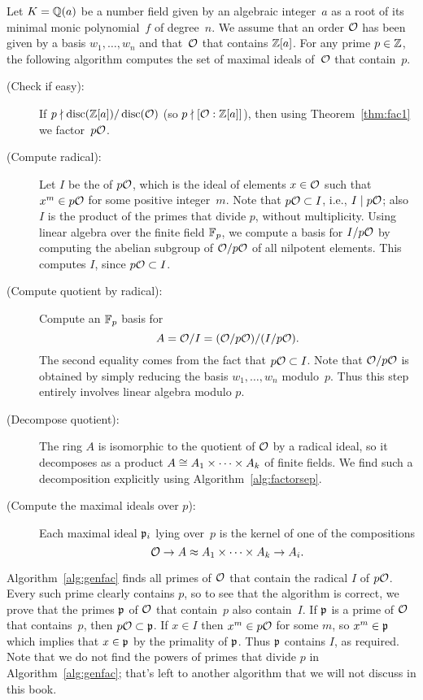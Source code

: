 \begin{algorithm}\label{alg:genfac}
	Let $K=\mathbb{Q}(a)$ be a number field given by an algebraic integer~$a$
	as a root of its minimal monic polynomial~$f$ of degree~$n$.
	We assume that an order $\mathcal{O}$ has been given by a basis $w_1,\ldots,w_n$
	and that~$\mathcal{O}$ that contains $\mathbb{Z}[a]$.
	For any prime $p\in\mathbb{Z}$, the following algorithm computes the set of
	maximal ideals of~$\mathcal{O}$ that contain~$p$.
	\begin{description}
		\item[\normalfont (Check if easy):] If $p\nmid \operatorname{disc}(\mathbb{Z}[a]) / \operatorname{disc}(\mathcal{O})$ (so
		$p\nmid [\mathcal{O}:\mathbb{Z}[a]]$), then using Theorem~\ref{thm:fac1} we
		factor~$p\mathcal{O}$.

		\item[\normalfont (Compute radical):]
		Let $I$ be the  of $p\mathcal{O}$, which is the ideal of
		elements $x\in\mathcal{O}$ such that $x^m\in p\mathcal{O}$
		for some positive integer~$m$.  Note that $p\mathcal{O} \subset I$, i.e.,
		$I\mid p\mathcal{O}$; also~$I$ is the product
		of the primes that divide $p$, without multiplicity.
		Using linear algebra over the finite field
		$\mathbb{F}_p$, we compute a basis for $I/p\mathcal{O}$ by computing
		the abelian subgroup of $\mathcal{O}/p\mathcal{O}$ of all nilpotent
		elements.  This computes $I$, since $p\mathcal{O}\subset I$.

		\item[\normalfont (Compute quotient by radical):]
		Compute an $\mathbb{F}_p$ basis for
		$$
			A = \mathcal{O}/I = (\mathcal{O}/p\mathcal{O})/(I/p\mathcal{O}).
		$$
		The second equality comes from the fact that $p\mathcal{O}\subset I$.
		Note that $\mathcal{O}/p\mathcal{O}$
		is obtained by simply reducing the basis $w_1,\ldots, w_n$ modulo~$p$.
		Thus this step entirely involves linear algebra modulo $p$.

		\item[\normalfont (Decompose quotient):] The ring $A$ is isomorphic to
		the quotient of $\mathcal{O}$ by a radical ideal,
		so it decomposes as a product
		$A \cong A_1 \times \cdots \times A_k$ of finite fields.
		We find such a decomposition explicitly using Algorithm~\ref{alg:factorsep}.

		\item[\normalfont (Compute the maximal ideals over $p$):] Each maximal ideal
		$\mathfrak{p}_i$ lying over~$p$ is the kernel of one of the compositions
		$$
			\mathcal{O} \to A \approx A_1 \times \cdots \times A_k \to A_i.
		$$
	\end{description}
\end{algorithm}
Algorithm~\ref{alg:genfac} finds all primes of $\mathcal{O}$ that contain the radical $I$ of
$p\mathcal{O}$.  Every such prime clearly contains $p$, so to see that the
algorithm is correct, we prove that the primes $\mathfrak{p}$ of $\mathcal{O}$ that
contain~$p$ also contain~$I$.  If $\mathfrak{p}$ is a prime of $\mathcal{O}$ that
contains~$p$, then $p\mathcal{O} \subset \mathfrak{p}$.  If $x\in I$ then $x^m\in p\mathcal{O}$
for some $m$, so $x^m\in \mathfrak{p}$ which implies that $x\in \mathfrak{p}$ by the primality
of $\mathfrak{p}$.  Thus $\mathfrak{p}$ contains $I$, as required.  Note that we do not find the powers of
primes that divide $p$ in Algorithm~\ref{alg:genfac}; that's left to another
algorithm that we will not discuss in this book.

